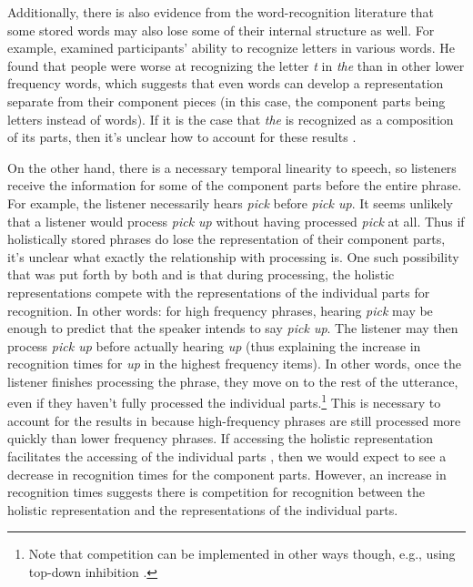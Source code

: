 \documentclass[
  authoryear,
  preprint,
  1p,
  onecolumn]{elsarticle}
\begin{document}
Additionally, there is also evidence from the word-recognition
literature that some stored words may also lose some of their internal
structure as well. For example, \citet{healy1976} examined participants'
ability to recognize letters in various words. He found that people were
worse at recognizing the letter \emph{t} in \emph{the} than in other
lower frequency words, which suggests that even words can develop a
representation separate from their component pieces (in this case, the
component parts being letters instead of words). If it is the case that
\emph{the} is recognized as a composition of its parts, then it's
unclear how to account for these results \citep[c.f.,][who suggested
that one explanation is that people don't fixate as long on
high-frequency and function words, of which \emph{the} is
both]{kapatsinski2009}.

On the other hand, there is a necessary temporal linearity to speech, so
listeners receive the information for some of the component parts before
the entire phrase. For example, the listener necessarily hears
\emph{pick} before \emph{pick up}. It seems unlikely that a listener
would process \emph{pick up} without having processed \emph{pick} at
all. Thus if holistically stored phrases do lose the representation of
their component parts, it's unclear what exactly the relationship with
processing is. One such possibility that was put forth by both
\citet{kapatsinski2009} and \citet{healy1976} is that during processing,
the holistic representations compete with the representations of the
individual parts for recognition. In other words: for high frequency
phrases, hearing \emph{pick} may be enough to predict that the speaker
intends to say \emph{pick up}. The listener may then process \emph{pick
up} before actually hearing \emph{up} (thus explaining the increase in
recognition times for \emph{up} in the highest frequency items). In
other words, once the listener finishes processing the phrase, they move
on to the rest of the utterance, even if they haven't fully processed
the individual parts.\footnote{Note that competition can be implemented
  in other ways though, e.g., using top-down inhibition
  \citep{libbenEverythingPsycholinguisticsMaterial2005}.} This is
necessary to account for the results in \citet{kapatsinski2009} because
high-frequency phrases are still processed more quickly than lower
frequency phrases. If accessing the holistic representation facilitates
the accessing of the individual parts \citep[as predicted by the IA
model,][]{mcclellandInteractiveActivationModel1981}, then we would
expect to see a decrease in recognition times for the component parts.
However, an increase in recognition times suggests there is competition
for recognition between the holistic representation and the
representations of the individual parts.
\end{document}
